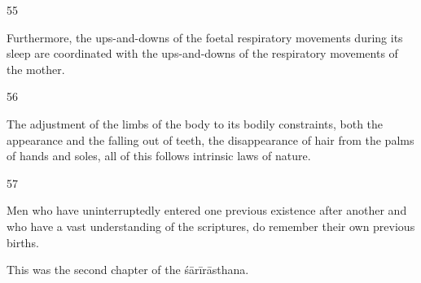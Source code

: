 \begin{translation}
\begin{tt}
\item[55]

Furthermore, the ups-and-downs of the foetal respiratory movements 
  during its sleep are coordinated with the ups-and-downs of the respiratory 
  movements of the mother.
  
\item[56]

 The adjustment of the limbs of the body to its bodily constraints, both 
  the appearance and the falling out of teeth, the disappearance of hair from the 
  palms of hands and soles, all of this follows intrinsic laws of nature.
  
\item[57]

 Men who have uninterruptedly entered one previous existence after 
  another and who have a vast understanding of the scriptures, do remember 
  their own previous births.
  
  This was the second chapter of the śārīrāsthana.
  
\end{tt}
\end{translation}
